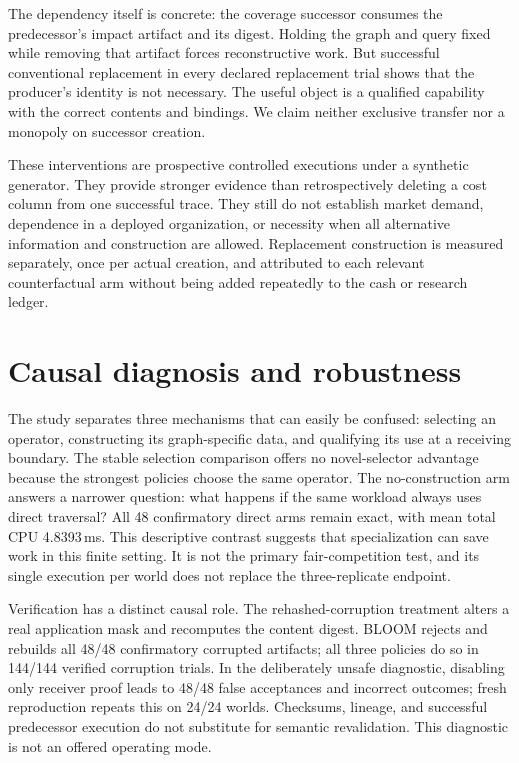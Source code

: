 \documentclass[11pt,letterpaper]{article}
\begin{document}
The dependency itself is concrete: the coverage successor consumes the predecessor's impact artifact and its digest. Holding the graph and query fixed while removing that artifact forces reconstructive work. But successful conventional replacement in every declared replacement trial shows that the producer's identity is not necessary. The useful object is a qualified capability with the correct contents and bindings. We claim neither exclusive transfer nor a monopoly on successor creation.

These interventions are prospective controlled executions under a synthetic generator. They provide stronger evidence than retrospectively deleting a cost column from one successful trace. They still do not establish market demand, dependence in a deployed organization, or necessity when all alternative information and construction are allowed. Replacement construction is measured separately, once per actual creation, and attributed to each relevant counterfactual arm without being added repeatedly to the cash or research ledger.

\FloatBarrier
\section{Causal diagnosis and robustness}
\label{sec:causal}
The study separates three mechanisms that can easily be confused: selecting an operator, constructing its graph-specific data, and qualifying its use at a receiving boundary. The stable selection comparison offers no novel-selector advantage because the strongest policies choose the same operator. The no-construction arm answers a narrower question: what happens if the same workload always uses direct traversal? All 48 confirmatory direct arms remain exact, with mean total CPU 4.8393\,ms. This descriptive contrast suggests that specialization can save work in this finite setting. It is not the primary fair-competition test, and its single execution per world does not replace the three-replicate endpoint.

Verification has a distinct causal role. The rehashed-corruption treatment alters a real application mask and recomputes the content digest. BLOOM rejects and rebuilds all 48/48 confirmatory corrupted artifacts; all three policies do so in 144/144 verified corruption trials. In the deliberately unsafe diagnostic, disabling only receiver proof leads to 48/48 false acceptances and incorrect outcomes; fresh reproduction repeats this on 24/24 worlds. Checksums, lineage, and successful predecessor execution do not substitute for semantic revalidation. This diagnostic is not an offered operating mode.
\end{document}
